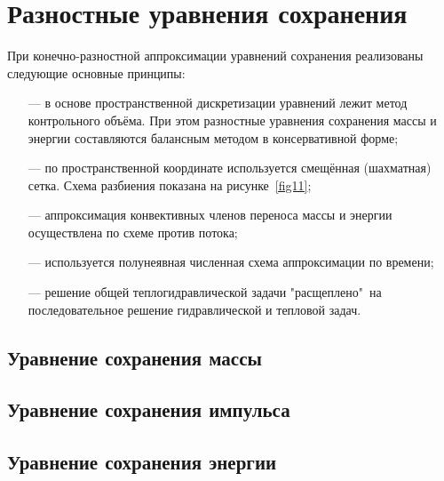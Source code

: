 
\section{Разностные уравнения сохранения}
\label{sec:section4}
При конечно-разностной аппроксимации уравнений сохранения реализованы следующие основные принципы:
\begin{itemize}[topsep=5pt, itemsep=-3pt]
\item[---] в основе пространственной дискретизации уравнений лежит метод контрольного объёма. При этом разностные уравнения сохранения массы и энергии составляются балансным методом в консервативной форме;
\item[---] по пространственной координате используется смещённая (шахматная) сетка. Схема разбиения показана на рисунке~\ref{fig11};
\item[---] аппроксимация конвективных членов переноса массы и энергии осуществлена по схеме против потока;
\item[---] используется полунеявная численная схема аппроксимации по времени;
\item[---] решение общей теплогидравлической задачи "расщеплено"\  на последовательное решение гидравлической и тепловой задач.  	
\end{itemize}
\subsection{Уравнение сохранения массы}	


\subsection{Уравнение сохранения импульса}


\subsection{Уравнение сохранения энергии}

\newpage
